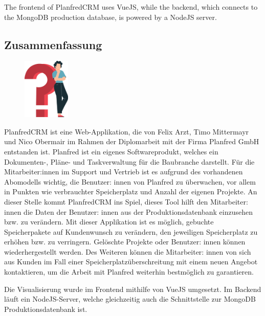 The frontend of PlanfredCRM uses VueJS, while the backend, which connects to the MongoDB production database, is powered by a NodeJS server.
\newpage
\begin{spacing}{1}
    \chapter*{Zusammenfassung}
\end{spacing}
\begin{figure}
    \begin{center}
      \includegraphics[width=0.2\textwidth]{pics/question_mark.png}
    \end{center}
\end{figure}
PlanfredCRM ist eine Web-Applikation, die von Felix Arzt, Timo Mittermayr und Nico Obermair im Rahmen der Diplomarbeit mit der Firma Planfred GmbH entstanden ist. Planfred ist ein eigenes Softwareprodukt, welches ein Dokumenten-, Pläne- und Taskverwaltung für die Baubranche darstellt. Für die Mitarbeiter:innen im Support und Vertrieb ist es aufgrund des vorhandenen Abomodells wichtig, die Benutzer: innen von Planfred zu überwachen, vor allem in Punkten wie verbrauchter Speicherplatz und Anzahl der eigenen Projekte. An dieser Stelle kommt PlanfredCRM ins Spiel, dieses Tool hilft den Mitarbeiter: innen die Daten der Benutzer: innen aus der Produktionsdatenbank einzusehen bzw. zu verändern. Mit dieser Applikation ist es möglich, gebuchte Speicherpakete auf Kundenwunsch zu verändern, den jeweiligen Speicherplatz zu erhöhen bzw. zu verringern. Gelöschte Projekte oder Benutzer: innen können wiederhergestellt werden. Des Weiteren können die Mitarbeiter: innen von sich aus Kunden im Fall einer Speicherplatzüberschreitung mit einem neuen Angebot kontaktieren, um die Arbeit mit Planfred weiterhin bestmöglich zu garantieren.

Die Visualisierung wurde im Frontend mithilfe von VueJS umgesetzt. Im Backend läuft ein NodeJS-Server, welche gleichzeitig auch die Schnittstelle zur MongoDB Produktionsdatenbank ist.

